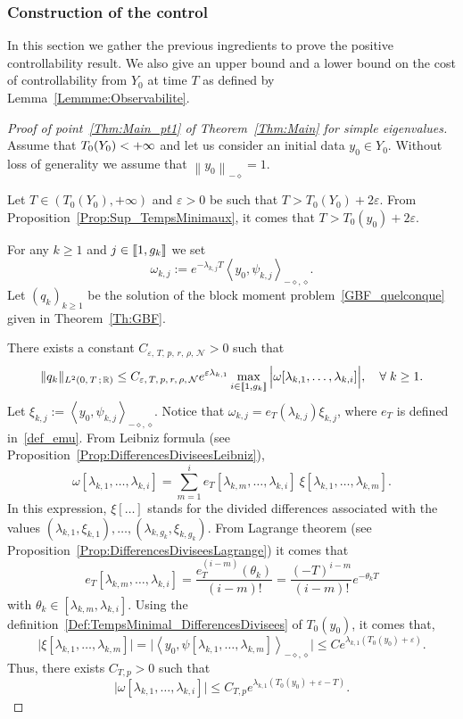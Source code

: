 \documentclass[10pt]{amsart}
\theoremstyle{definition}\newtheorem{defi}[theo]{Definition}\newtheorem{rema}[theo]{Remark}\newtheorem{exam}[theo]{Example}\newtheorem{exem}[theo]{Example}\newtheorem{nota}[theo]{Notation}
\newcommand{\llbracket}{\mathopen{[\mkern -2.7mu[}}
\newcommand{\rrbracket}{\mathclose{]\mkern -2.7mu]}}
\newcommand{\inter}[2]{\llbracket #1,#2 \rrbracket}
\newcommand{\Fzp}{Y_0}
\newcommand{\normeXmalpha}[1]{\left\| #1 \right\|_{-\diamond}}
\newcommand{\dual}[2]{\left\langle #1, #2 \right\rangle_{-\diamond,\diamond}}
\newcommand{\n}{g}
\newcommand{\NN}{\mathcal{N}}
\newcommand{\R}{\mathbb{R}}
\let\oldforall\forall
\renewcommand*{\forall}{\mathrel{\oldforall}}
\begin{document}
\subsubsection{Construction of the control} \label{Subsec:ConstructionControle}
In this section we gather the previous ingredients to prove the positive controllability result. We also give an upper bound and a lower bound on the cost of controllability from $\Fzp$ at time $T$ as defined by Lemma~\ref{Lemmme:Observabilite}.
\begin{proof}[Proof of point~\eqref{Thm:Main_pt1} of Theorem~\ref{Thm:Main} for simple eigenvalues]
Assume that $T_0(\Fzp)\linebreak <+\infty$ and let us consider an initial data $y_0\in \Fzp$. Without loss of generality we assume that $\normeXmalpha{y_0}=1$.

Let $T\in (T_0(\Fzp), +\infty)$ and $\varepsilon >0$ be such that $T> T_0(\Fzp) + 2\varepsilon$. From Proposition~\ref{Prop:Sup_TempsMinimaux}, it comes that $T> T_0(y_0) + 2\varepsilon$.

For any $k \geq 1$ and $j \in \inter{1}{\n_k}$ we set
\[
\omega_{k,j} := e^{-\lambda_{k,j} T} \dual{y_0}{\psi_{k,j}}.
\]
Let $(q_k)_{k \geq 1}$ be the solution of the block moment problem~\eqref{GBF_quelconque} given in Theorem~\ref{Th:GBF}.

There exists a constant $C_{\varepsilon,\,T,\, p,\, r,\, \rho,\, \NN} >0$ such that
\[
\| q_k \|_{L^2(0,\,T\,;\,\R)} \leq C_{\varepsilon,\,T,\,p,\,r,\,\rho,\,\NN} e^{\varepsilon \lambda_{k,1} }
\max \limits_{i\in \inter{1}{\n_k}} \Big| \omega[\lambda_{k,1}, \dots, \lambda_{k,i}] \Big|, \quad \forall k \geq 1.
\]
Let $\xi_{k,j} := \dual{y_0}{\psi_{k,j}}$. Notice that $\omega_{k,j} = e_T(\lambda_{k,j}) \xi_{k,j}$, where $e_T$ is defined in~\eqref{def_emu}. From Leibniz formula (see Proposition~\ref{Prop:DifferencesDiviseesLeibniz}),
\begin{equation}\label{GBF_Leibniz_omega}
\omega[\lambda_{k,1},\dots,\lambda_{k,i}] = \sum_{m=1}^i e_T[\lambda_{k,m},\dots,\lambda_{k,i}] \: \xi[\lambda_{k,1}, \dots, \lambda_{k,m}].
\end{equation}
In this expression, $\xi[\dots]$ stands for the divided differences associated with the values $(\lambda_{k,1}, \xi_{k,1}), \dots,(\lambda_{k,\n_k},\xi_{k,\n_k})$. From Lagrange theorem (see Proposition~\ref{Prop:DifferencesDiviseesLagrange}) it comes that
\[
e_T[\lambda_{k,m},\dots,\lambda_{k,i}] = \frac{e_T^{(i-m)}(\theta_k)}{(i-m)!} = \frac{(-T)^{i-m}}{(i-m)!} e^{-\theta_k T}
\]
with $\theta_k \in [\lambda_{k,m}, \lambda_{k,i}]$. Using the definition~\eqref{Def:TempsMinimal_DifferencesDivisees} of $T_0(y_0)$, it comes that,
\begin{equation}\label{GBF_Estimee_Xi_kj}
\big| \xi[\lambda_{k,1}, \dots, \lambda_{k,m}] \big| = \big| \dual{y_0}{\psi[\lambda_{k,1}, \dots, \lambda_{k,m}]} \big| \leq C e^{\lambda_{k,1} (T_0(y_0) + \varepsilon)}.
\end{equation}
Thus, there exists $C_{T, p} >0$ such that
\[
\big| \omega[\lambda_{k,1}, \dots, \lambda_{k,i}] \big| \leq C_{T,p} e^{\lambda_{k,1} (T_0(y_0) +\varepsilon - T)}.
\]


\end{proof}
\end{document}
